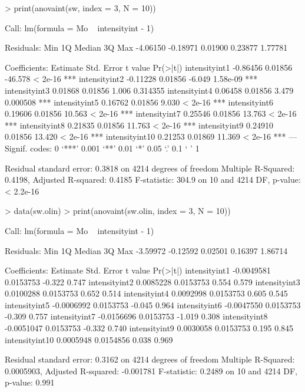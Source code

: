 \documentclass[a4paper,11pt]{article}
\begin{document}
\begin{Schunk}
\begin{Sinput}
> print(anovaint(sw, index = 3, N = 10))
\end{Sinput}
\begin{Soutput}
Call:
lm(formula = Mo ~ intensityint - 1)

Residuals:
     Min       1Q   Median       3Q      Max 
-4.06150 -0.18971  0.01900  0.23877  1.77781 

Coefficients:
               Estimate Std. Error t value Pr(>|t|)    
intensityint1  -0.86456    0.01856 -46.578  < 2e-16 ***
intensityint2  -0.11228    0.01856  -6.049 1.58e-09 ***
intensityint3   0.01868    0.01856   1.006 0.314355    
intensityint4   0.06458    0.01856   3.479 0.000508 ***
intensityint5   0.16762    0.01856   9.030  < 2e-16 ***
intensityint6   0.19606    0.01856  10.563  < 2e-16 ***
intensityint7   0.25546    0.01856  13.763  < 2e-16 ***
intensityint8   0.21835    0.01856  11.763  < 2e-16 ***
intensityint9   0.24910    0.01856  13.420  < 2e-16 ***
intensityint10  0.21253    0.01869  11.369  < 2e-16 ***
---
Signif. codes:  0 `***' 0.001 `**' 0.01 `*' 0.05 `.' 0.1 ` ' 1 

Residual standard error: 0.3818 on 4214 degrees of freedom
Multiple R-Squared: 0.4198,	Adjusted R-squared: 0.4185 
F-statistic: 304.9 on 10 and 4214 DF,  p-value: < 2.2e-16 
\end{Soutput}
\end{Schunk}

\begin{Schunk}
\begin{Sinput}
> data(sw.olin)
> print(anovaint(sw.olin, index = 3, N = 10))
\end{Sinput}
\begin{Soutput}
Call:
lm(formula = Mo ~ intensityint - 1)

Residuals:
     Min       1Q   Median       3Q      Max 
-3.59972 -0.12592  0.02501  0.16397  1.86714 

Coefficients:
                 Estimate Std. Error t value Pr(>|t|)
intensityint1  -0.0049581  0.0153753  -0.322    0.747
intensityint2   0.0085228  0.0153753   0.554    0.579
intensityint3   0.0100288  0.0153753   0.652    0.514
intensityint4   0.0092998  0.0153753   0.605    0.545
intensityint5  -0.0006992  0.0153753  -0.045    0.964
intensityint6  -0.0047550  0.0153753  -0.309    0.757
intensityint7  -0.0156696  0.0153753  -1.019    0.308
intensityint8  -0.0051047  0.0153753  -0.332    0.740
intensityint9   0.0030058  0.0153753   0.195    0.845
intensityint10  0.0005948  0.0154856   0.038    0.969

Residual standard error: 0.3162 on 4214 degrees of freedom
Multiple R-Squared: 0.0005903,	Adjusted R-squared: -0.001781 
F-statistic: 0.2489 on 10 and 4214 DF,  p-value: 0.991 
\end{Soutput}
\end{Schunk}
\end{document}

